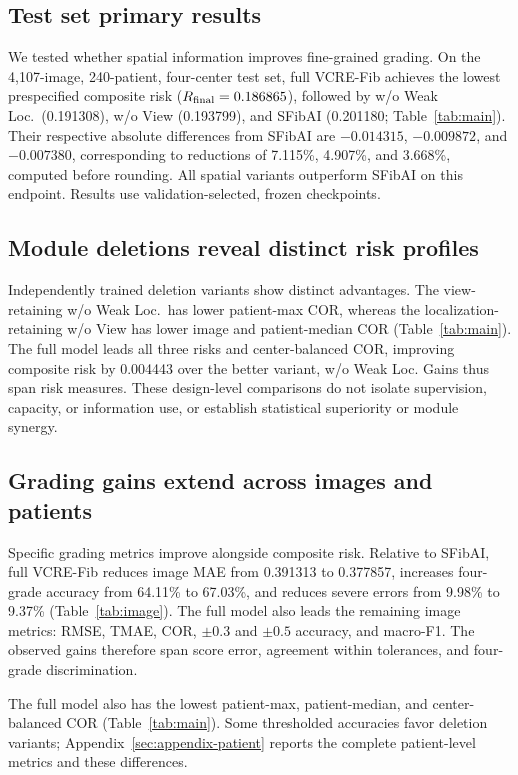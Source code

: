 \subsection{Test set primary results}\label{sec:test}
We tested whether spatial information improves fine-grained grading. On the 4,107-image, 240-patient, four-center test set, full VCRE-Fib achieves the lowest prespecified composite risk ($R_{\mathrm{final}}=0.186865$), followed by w/o Weak Loc.\ (0.191308), w/o View (0.193799), and SFibAI (0.201180; Table~\ref{tab:main}). Their respective absolute differences from SFibAI are $-0.014315$, $-0.009872$, and $-0.007380$, corresponding to reductions of 7.115\%, 4.907\%, and 3.668\%, computed before rounding. All spatial variants outperform SFibAI on this endpoint. Results use validation-selected, frozen checkpoints.

\subsection{Module deletions reveal distinct risk profiles}
Independently trained deletion variants show distinct advantages. The view-retaining w/o Weak Loc.\ has lower patient-max COR, whereas the localization-retaining w/o View has lower image and patient-median COR (Table~\ref{tab:main}). The full model leads all three risks and center-balanced COR, improving composite risk by 0.004443 over the better variant, w/o Weak Loc. Gains thus span risk measures. These design-level comparisons do not isolate supervision, capacity, or information use, or establish statistical superiority or module synergy.

\subsection{Grading gains extend across images and patients}
Specific grading metrics improve alongside composite risk. Relative to SFibAI, full VCRE-Fib reduces image MAE from 0.391313 to 0.377857, increases four-grade accuracy from 64.11\% to 67.03\%, and reduces severe errors from 9.98\% to 9.37\% (Table~\ref{tab:image}). The full model also leads the remaining image metrics: RMSE, TMAE, COR, $\pm0.3$ and $\pm0.5$ accuracy, and macro-F1. The observed gains therefore span score error, agreement within tolerances, and four-grade discrimination.

The full model also has the lowest patient-max, patient-median, and center-balanced COR (Table~\ref{tab:main}). Some thresholded accuracies favor deletion variants; Appendix~\ref{sec:appendix-patient} reports the complete patient-level metrics and these differences.

